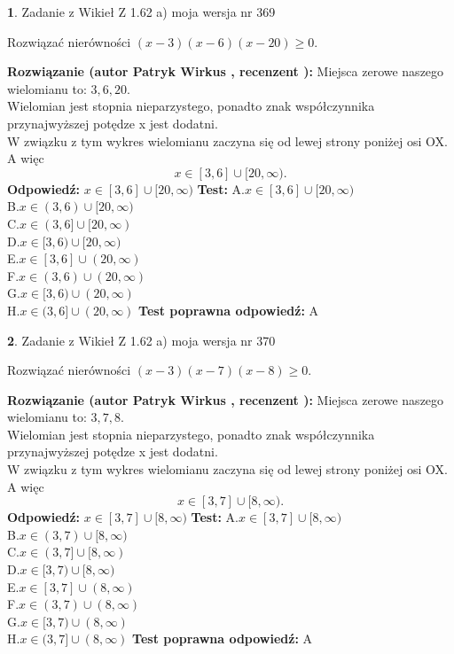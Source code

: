 \documentclass[12pt, a4paper]{article}
\theoremstyle{definition} %
\newtheorem{zad}{}
\newcommand{\zadStart}[1]{\begin{zad}#1\newline}
\newcommand{\zadStop}{\end{zad}}
\newcommand{\rozwStart}[2]{\noindent \textbf{Rozwiązanie (autor #1 , recenzent #2): }\newline}
\newcommand{\rozwStop}{\newline}
\newcommand{\odpStart}{\noindent \textbf{Odpowiedź:}\newline}
\newcommand{\odpStop}{\newline}
\newcommand{\testStart}{\noindent \textbf{Test:}\newline}
\newcommand{\testStop}{\newline}
\newcommand{\kluczStart}{\noindent \textbf{Test poprawna odpowiedź:}\newline}
\newcommand{\kluczStop}{\newline}
\begin{document}
\zadStart{Zadanie z Wikieł Z 1.62 a) moja wersja nr 369}

Rozwiązać nierówności $(x-3)(x-6)(x-20)\ge0$.
\zadStop
\rozwStart{Patryk Wirkus}{}
Miejsca zerowe naszego wielomianu to: $3, 6, 20$.\\
Wielomian jest stopnia nieparzystego, ponadto znak współczynnika przy\linebreak najwyższej potędze x jest dodatni.\\ W związku z tym wykres wielomianu zaczyna się od lewej strony poniżej osi OX. A więc $$x \in [3,6] \cup [20,\infty).$$
\rozwStop
\odpStart
$x \in [3,6] \cup [20,\infty)$
\odpStop
\testStart
A.$x \in [3,6] \cup [20,\infty)$\\
B.$x \in (3,6) \cup [20,\infty)$\\
C.$x \in (3,6] \cup [20,\infty)$\\
D.$x \in [3,6) \cup [20,\infty)$\\
E.$x \in [3,6] \cup (20,\infty)$\\
F.$x \in (3,6) \cup (20,\infty)$\\
G.$x \in [3,6) \cup (20,\infty)$\\
H.$x \in (3,6] \cup (20,\infty)$
\testStop
\kluczStart
A
\kluczStop



\zadStart{Zadanie z Wikieł Z 1.62 a) moja wersja nr 370}

Rozwiązać nierówności $(x-3)(x-7)(x-8)\ge0$.
\zadStop
\rozwStart{Patryk Wirkus}{}
Miejsca zerowe naszego wielomianu to: $3, 7, 8$.\\
Wielomian jest stopnia nieparzystego, ponadto znak współczynnika przy\linebreak najwyższej potędze x jest dodatni.\\ W związku z tym wykres wielomianu zaczyna się od lewej strony poniżej osi OX. A więc $$x \in [3,7] \cup [8,\infty).$$
\rozwStop
\odpStart
$x \in [3,7] \cup [8,\infty)$
\odpStop
\testStart
A.$x \in [3,7] \cup [8,\infty)$\\
B.$x \in (3,7) \cup [8,\infty)$\\
C.$x \in (3,7] \cup [8,\infty)$\\
D.$x \in [3,7) \cup [8,\infty)$\\
E.$x \in [3,7] \cup (8,\infty)$\\
F.$x \in (3,7) \cup (8,\infty)$\\
G.$x \in [3,7) \cup (8,\infty)$\\
H.$x \in (3,7] \cup (8,\infty)$
\testStop
\kluczStart
A
\kluczStop
\end{document}
